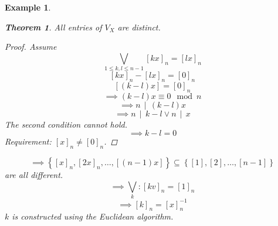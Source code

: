 \documentclass[a4paper,landscape,twocolumn]{article}
\newcommand\set[1]{\left\{#1\right\}}
\newcommand\divides[2]{#1\,\mid\,#2}
\newtheorem{theorem}{Theorem}[section]
\newtheorem{ex}{Example}[section]
\begin{document}
\begin{ex}
\begin{description}
      \begin{theorem}
        All entries of $V_X$ are distinct.
      \end{theorem}
      \begin{proof}
        Assume
        \[ \bigvee_{1 \leq k, l \leq n-1} [kx]_n = [lx]_n \]
        \[ [kx]_n - [lx]_n = [0]_n \]
        \[ [(k-l) x] = [0]_n \]
        \[ \implies (k-l) x \equiv 0 \mod{n} \]
        \[ \implies \divides{n}{(k-l)x} \]
        \[ \implies \divides{n}{k-l} \lor \divides{n}{x} \]
        The second condition cannot hold.
        \[ \implies k - l = 0 \]
        Requirement: $[x]_n \neq [0]_n$.
      \end{proof}

      \[ \implies \set{[x]_n, [2x]_n, \ldots, [(n-1)x]} \subseteq \set{[1], [2], \ldots, [n-1]} \]
      are all different.
      \[ \implies \bigvee_{k}: [kv]_n = [1]_n \]
      \[ \implies [k]_n = [x]_n^{-1} \]
      $k$ is constructed using the Euclidean algorithm.
  \end{description}
\end{ex}
\end{document}
